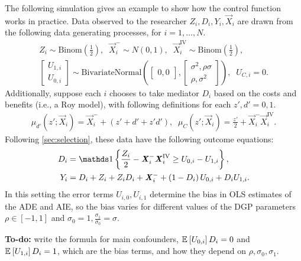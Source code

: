 The following simulation gives an example to show how the control function works in practice.
Data observed to the researcher $Z_i, D_i, Y_i, \vec X_i$ are drawn from the following data generating processes, for $i = 1, \hdots, N$.
\begin{align*}
    Z_i \sim \text{Binom}\left( \frac 12 \right),
    \;\; \vec X_i^- \sim N(0, 1),
    \;\; \vec X_i^{\text{IV}} \sim \text{Binom}\left( \frac 12 \right), \\
    \begin{bmatrix} U_{1,i} \\ U_{0,i} \end{bmatrix} \sim
    \text{BivariateNormal}\left( 
        \begin{bmatrix} 0, 0 \end{bmatrix},
        \begin{bmatrix} \sigma^2, \rho \sigma \\ \rho, \sigma^2 \end{bmatrix} \right),
    \;\; U_{C,i} = 0.
\end{align*}
Additionally, suppose each $i$ chooses to take mediator $D_i$ based on the costs and benefits (i.e., a Roy model), with following definitions for each $z', d' = 0, 1$.
\begin{align*}
    \mu_{d'}\left(z' ; \vec X_i \right) = \vec X_i^- + \left( z' + d' + z' d' \right),
    \;\; \mu_{C}\left(z' ; \vec X_i \right) = \frac{z'}{2} + \vec X_i^- \vec X_i^{\text{IV}}.
\end{align*}
Following \autoref{sec:selection}, these data have the following outcome equations:
\begin{align*}
    D_i &= \indicator{\frac{Z_i}{2} - \vec X_i^- \vec X_i^{\text{IV}} \geq U_{0,i} - U_{1,i}},  \\
    Y_i &= D_i + Z_i + Z_i D_i + \vec X_i^-
        + \left( 1 - D_i \right) U_{0,i} + D_i U_{1,i}.
\end{align*}
In this setting the error terms $U_{i, 0}, U_{i, 1}$ determine the bias in OLS estimates of the ADE and AIE, so the bias varies for different values of the DGP parameters $\rho \in [-1, 1]$ and $\sigma_0 = 1, \frac{\sigma_1}{\sigma_0} = \sigma$.

\textbf{To-do:} write the formula for main confounders, $\mathbb{E}_{} \left[ U_{0,i} \right]{D_i = 0}$ and $\mathbb{E}_{} \left[ U_{1,i} \right]{D_i = 1}$, which are the bias terms, and how they depend on $\rho, \sigma_0, \sigma_1$.


